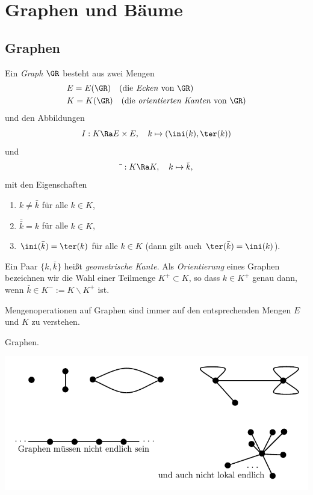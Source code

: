 \chapter{Graphen und Bäume}

\section{Graphen}\label{sec_graphen}

\DEF Ein \emph{Graph} $\GR$ besteht aus zwei Mengen
\begin{align*}
& E=E(\GR) \quad \text{(die \emph{Ecken}\index{Ecke} von $\GR$)} \\
& K=K(\GR) \quad \text{(die \emph{orientierten Kanten}\index{Kante}\index{orientierte Kanten}\index{Kante!orientiert} von $\GR$)}\index{$\GR$}\index{$E(\GR)$}\index{$K(\GR)$}\index{$\ini(k)$, $\ter(k)$}
\end{align*}
und den Abbildungen
\[
I : K \Ra E\times E,\quad k \mapsto (\ini(k),\ter(k))
\]
und
\[
\bar{\ }:K\Ra K,\quad k\mapsto\bar{k},
\]
mit den Eigenschaften
\begin{enumerate}
\item $k\neq \bar{k}$ für alle $k\in K$,
\item $\bar{\bar{k}}=k$ für alle $k\in K$,
\item $\ini(\bar{k})=\ter(k)$ für alle $k\in K$ (dann gilt auch $\ter(\bar{k})=\ini(k)$).
\end{enumerate}
Ein Paar $\{k,\bar{k}\}$ heißt \emph{geometrische Kante}.
Als \emph{Orientierung} eines Graphen bezeichnen
wir die Wahl einer Teilmenge $K^+ \subset K$, so dass
$k\in K^+$ genau dann, wenn
$\bar{k}\in K^- := K\backslash K^+$ ist.

Mengenoperationen auf Graphen sind immer auf den entsprechenden
Mengen $E$ und $K$ zu verstehen.

\BSP Graphen.
\begin{center}
	\includegraphics{grugraImages/bspgraphen}
\end{center}

